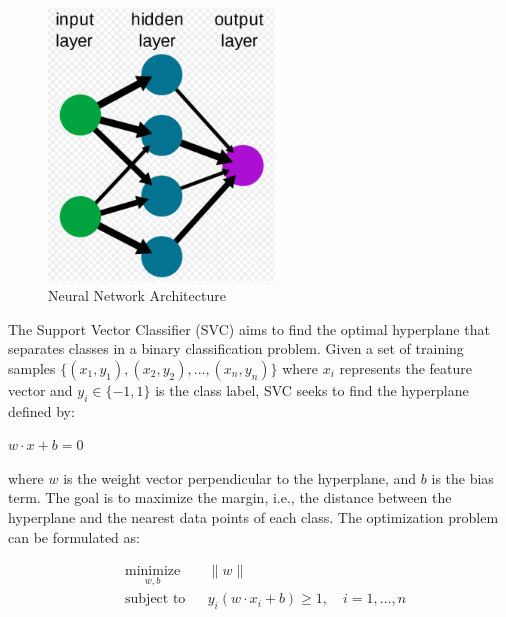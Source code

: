 \documentclass[12pt]{report}
\begin{document}
\begin{figure}[H]\centering\includegraphics[width=6cm]{FFNN.png}\caption{Neural Network Architecture}\end{figure}


The Support Vector Classifier (SVC) aims to find the optimal hyperplane that separates classes in a binary classification problem. Given a set of training samples $\{(x_1, y_1), (x_2, y_2), \ldots, (x_n, y_n)\}$ where $x_i$ represents the feature vector and $y_i \in \{-1, 1\}$ is the class label, SVC seeks to find the hyperplane defined by:


$w \cdot x + b = 0$


where $w$ is the weight vector perpendicular to the hyperplane, and $b$ is the bias term. The goal is to maximize the margin, i.e., the distance between the hyperplane and the nearest data points of each class. The optimization problem can be formulated as:

\begin{align*}
	& \underset{w, b}{\text{minimize}}
	& & \|w\| \\
	& \text{subject to}
	& & y_i(w \cdot x_i + b) \geq 1, \quad i = 1, \ldots, n
\end{align*}

\end{document}
